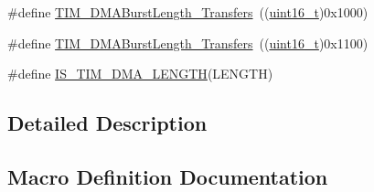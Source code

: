 \begin{DoxyCompactItemize}
\#define \hyperlink{group___t_i_m___d_m_a___burst___length_ga5b2c97f650a3c1726965187d852b8cc5}{T\+I\+M\+\_\+\+D\+M\+A\+Burst\+Length\+\_\+Transfers}~((\hyperlink{_p_e___types_8h_a1f1825b69244eb3ad2c7165ddc99c956}{uint16\+\_\+t})0x1000)
\item 
\#define \hyperlink{group___t_i_m___d_m_a___burst___length_gaed9f2afef174079f6eb6927abd995b9b}{T\+I\+M\+\_\+\+D\+M\+A\+Burst\+Length\+\_\+Transfers}~((\hyperlink{_p_e___types_8h_a1f1825b69244eb3ad2c7165ddc99c956}{uint16\+\_\+t})0x1100)
\item 
\#define \hyperlink{group___t_i_m___d_m_a___burst___length_gafd09cf0887b01a15101ba7dd6e2b4ba7}{I\+S\+\_\+\+T\+I\+M\+\_\+\+D\+M\+A\+\_\+\+L\+E\+N\+G\+TH}(L\+E\+N\+G\+TH)
\end{DoxyCompactItemize}


\subsection{Detailed Description}


\subsection{Macro Definition Documentation}
